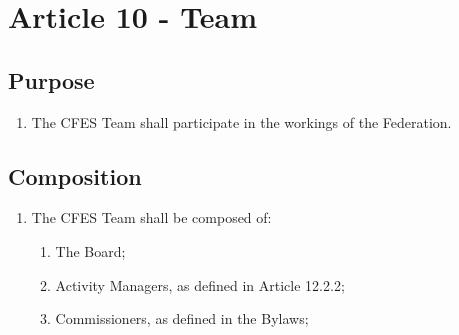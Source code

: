 \section{Article 10 - Team}
\label{article-10-team}

\subsection{Purpose}
\label{purpose-team}

\begin{enumerate}
 \item The CFES Team shall participate in the workings of the Federation.
\end{enumerate}

\subsection{Composition}
\label{composition-team}

\begin{enumerate}
 \item The CFES Team shall be composed of:
  \begin{enumerate}
   \item The Board;
   \item Activity Managers, as defined in Article 12.2.2;
   \item Commissioners, as defined in the Bylaws;
  \end{enumerate}
\end{enumerate}
